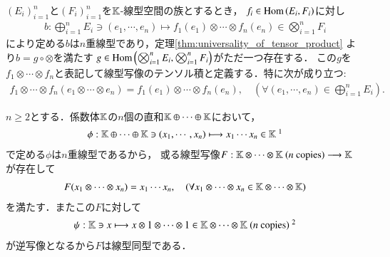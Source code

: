	\begin{screen}
		\begin{dfn}[線型写像のテンソル積]\label{def:tensor_products_of_linear_maps}
				$(E_i)_{i=1}^n$と$(F_i)_{i=1}^n$を$\mathbb{K}$-線型空間の族とするとき，
				$f_i \in \mathrm{Hom} \left(E_i,F_i\right)$に対し
				\begin{align}
					b: \bigoplus_{i=1}^n E_i \ni (e_1,\cdots,e_n)
					\longmapsto f_1(e_1)\otimes \cdots \otimes f_n(e_n)
					\in \bigotimes_{i=1}^n F_i
				\end{align}
				により定める$b$は$n$重線型であり，定理\ref{thm:universality_of_tensor_product}
				より$b = g \circ \otimes$を満たす
				$g \in \mathrm{Hom} \left(\bigotimes_{i=1}^{n} E_i,\bigotimes_{i=1}^{n} F_i\right)$がただ一つ存在する．
				この$g$を$f_1 \otimes \cdots \otimes f_n$と表記して線型写像のテンソル積と定義する．特に次が成り立つ:
				\begin{align}
					f_1 \otimes \cdots \otimes f_n(e_1 \otimes \cdots \otimes e_n)
					= f_1(e_1)\otimes \cdots \otimes f_n(e_n),
					\quad (\forall (e_1,\cdots,e_n) \in \bigoplus_{i=1}^n E_i).
				\end{align}
		\end{dfn}
	\end{screen}
	
	$n \geq 2$とする．係数体$\mathbb{K}$の$n$個の直和$\mathbb{K} \oplus \cdots \oplus \mathbb{K}$において，
	\begin{align}
		\phi:\K \oplus \cdots \oplus \K \ni (x_1,\cdots,x_n)
		\longmapsto x_1 \cdots x_n \in \K\ \footnotemark
	\end{align}
	で定める$\phi$は$n$重線型であるから，
	或る線型写像$F:\K \otimes \cdots \otimes \K\ \mbox{($n$ copies)} \longrightarrow \K$
	が存在して
	\begin{align}
		F(x_1 \otimes \cdots \otimes x_n) = x_1 \cdots x_n,
		\quad (\forall x_1 \otimes \cdots \otimes x_n \in \mathbb{K} \otimes \cdots \otimes \mathbb{K})
		\label{eq:tensor_products_of_linear_forms_1}
	\end{align}
	を満たす．またこの$F$に対して
	\begin{align}
		\psi:\K \ni x \longmapsto x \otimes 1 \otimes \cdots \otimes 1 
		\in \K \otimes \cdots \otimes \K\ 
		\mbox{($n$ copies)}\ \footnotemark
	\end{align}
	が逆写像となるから$F$は線型同型である．
	
